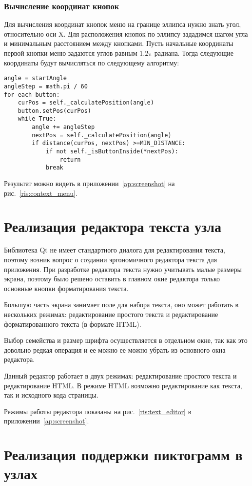 \subsubsection*{Вычисление координат кнопок}
Для вычисления координат кнопок меню на границе эллипса нужно знать угол, относительно оси X. 
Для расположения кнопок по эллипсу зададимся шагом угла и минимальным расстоянием между кнопками.
Пусть начальные координаты первой кнопки меню задаются углов равным $1.2\pi$ радиана.
Тогда следующие координаты будут вычисляться по следующему алгоритму:
\begin{lstlisting}
angle = startAngle
angleStep = math.pi / 60
for each button:
	curPos = self._calculatePosition(angle)
	button.setPos(curPos)
	while True:
		angle += angleStep
		nextPos = self._calculatePosition(angle)
		if distance(curPos, nextPos) >=MIN_DISTANCE:
			if not self._isButtonInside(*nextPos):
				return
			break
\end{lstlisting}

Результат можно видеть в приложении~\ref{ap:screenshot} на рис.~\ref{ris:context_menu}.

\section{Реализация редактора текста узла}\label{sec:node_text_editor}

Библиотека Qt не имеет стандартного диалога для редактирования текста, поэтому возник вопрос о создании эргономичного редактора текста для приложения.
При разработке редактора текста нужно учитывать малые размеры экрана, поэтому было решено оставить в главном окне редактора только основные кнопки форматирования текста.

Большую часть экрана занимает поле для набора текста, оно может работать в нескольких режимах: редактирование простого текста и редактирование форматированного текста (в формате HTML).

Выбор семейства и размер шрифта осуществляется в отдельном окне, так как это довольно редкая операция и ее можно ее можно убрать из основного окна редактора.

Данный редактор работает в двух режимах: редактирование простого текста и редактирование HTML. В режиме HTML возможно редактирование как текста, так и исходного кода страницы. 

Режимы работы редактора показаны на рис.~\ref{ris:text_editor} в приложении~\ref{ap:screenshot}.

\section{Реализация поддержки пиктограмм в узлах}\label{sec:node_icons_support}

